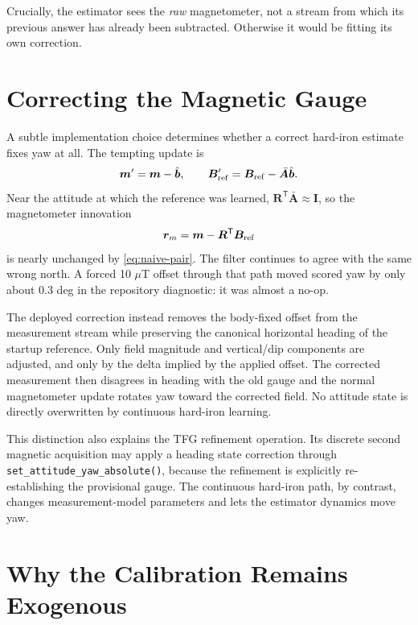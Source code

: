 \documentclass[conference]{IEEEtran}
\DeclareRobustCommand{\vct}[1]{\bm{#1}}
\DeclareRobustCommand{\mat}[1]{\bm{#1}}
\newcommand{\T}{^{\mathsf T}}
\begin{document}
Crucially, the estimator sees the \emph{raw} magnetometer, not a stream from which its
previous answer has already been subtracted.  Otherwise it would be fitting its own
correction.

\section{Correcting the Magnetic Gauge}
\label{sec:gauge-correction}

A subtle implementation choice determines whether a correct hard-iron estimate fixes
yaw at all.  The tempting update is
\begin{equation}
\vct m' = \vct m-\hat{\vct b},
\qquad
\vct B'_{\rm ref}=\vct B_{\rm ref}-\bar{\mat A}\hat{\vct b}.
\label{eq:naive-pair}
\end{equation}
Near the attitude at which the reference was learned,
$\mat R\T\bar{\mat A}\approx\mat I$, so the magnetometer innovation
\begin{equation}
\vct r_m=\vct m-\mat R\T\vct B_{\rm ref}
\end{equation}
is nearly unchanged by \cref{eq:naive-pair}.  The filter continues to agree with the
same wrong north.  A forced 10 $\mu$T offset through that path moved scored yaw by only
about 0.3 deg in the repository diagnostic: it was almost a no-op.

The deployed correction instead removes the body-fixed offset from the measurement
stream while preserving the canonical horizontal heading of the startup reference.
Only field magnitude and vertical/dip components are adjusted, and only by the delta
implied by the applied offset.  The corrected measurement then disagrees in heading
with the old gauge and the normal magnetometer update rotates yaw toward the corrected
field.  No attitude state is directly overwritten by continuous hard-iron learning.

This distinction also explains the TFG refinement operation.  Its discrete second
magnetic acquisition may apply a heading state correction through
\texttt{set\_attitude\_yaw\_absolute()}, because the refinement is explicitly
re-establishing the provisional gauge.  The continuous hard-iron path, by contrast,
changes measurement-model parameters and lets the estimator dynamics move yaw.

\section{Why the Calibration Remains Exogenous}
\label{sec:exogenous}
\end{document}
